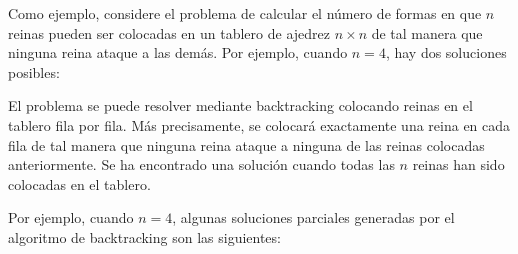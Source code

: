 
Como ejemplo, considere el problema de
calcular el número
de formas en que $n$ reinas pueden ser colocadas en
un tablero de ajedrez $n \times n$ de tal manera que
ninguna reina ataque a las demás.
Por ejemplo, cuando $n=4$,
hay dos soluciones posibles:

\begin{center}
\end{center}

El problema se puede resolver mediante backtracking
colocando reinas en el tablero fila por fila.
Más precisamente, se colocará exactamente una reina en cada fila de tal manera que ninguna reina ataque
a ninguna de las reinas colocadas anteriormente.
Se ha encontrado una solución cuando todas
las $n$ reinas han sido colocadas en el tablero.

Por ejemplo, cuando $n=4$,
algunas soluciones parciales generadas por
el algoritmo de backtracking son las siguientes:

